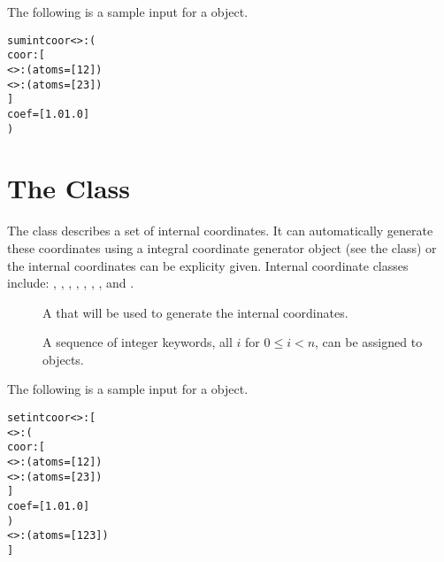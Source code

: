 The following is a sample  input for
a  object.
\begin{alltt}
  sumintcoor<>: (
    coor: [
      <>:( atoms = [ 1 2 ] )
      <>:( atoms = [ 2 3 ] )
      ]
    coef = [ 1.0 1.0 ]
    )
\end{alltt}


\section{The  Class}\label{SetIntCoor}

The  class describes a set of internal coordinates.  It
can automatically generate these coordinates using a integral coordinate
generator object (see the  class) or the internal
coordinates can be explicity given.  Internal coordinate classes include:
, , ,
, ,
, , and
.

\begin{description}
  \item[] A 
     that will be used to generate the internal
    coordinates.

  \item[] A sequence of integer keywords, all $i$ for $0 \leq i <
    n$, can be assigned to  objects.

\end{description}

The following is a sample  input for
a  object.
\begin{alltt}
  setintcoor<>: [
    <>: (
      coor: [
        <>:( atoms = [ 1 2 ] )
        <>:( atoms = [ 2 3 ] )
        ]
      coef = [ 1.0 1.0 ]
      )
    <>:( atoms = [ 1 2 3 ] )
  ]
\end{alltt}


